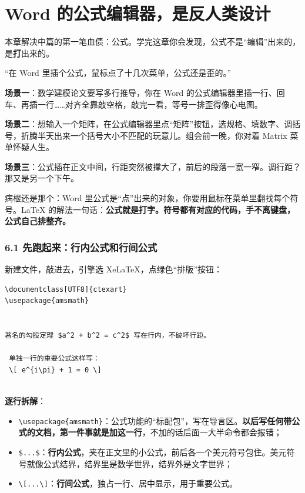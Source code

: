 \chapter{Word 的公式编辑器，是反人类设计}

\begin{notebox}
本章解决中篇的第一笔血债：公式。学完这章你会发现，公式不是“编辑”出来的，是\textbf{打}出来的。
\end{notebox}


“在 Word 里插个公式，鼠标点了十几次菜单，公式还是歪的。”


\textbf{场景一}：数学建模论文要写多行推导，你在 Word 的公式编辑器里插一行、回车、再插一行……对齐全靠敲空格，敲完一看，等号一排歪得像心电图。

\textbf{场景二}：想输入一个矩阵，在公式编辑器里点“矩阵”按钮，选规格、填数字、调括号，折腾半天出来一个括号大小不匹配的玩意儿。组会前一晚，你对着 Matrix 菜单怀疑人生。

\textbf{场景三}：公式插在正文中间，行距突然被撑大了，前后的段落一宽一窄。调行距？那又是另一个下午。

病根还是那个：Word 里公式是“点”出来的对象，你要用鼠标在菜单里翻找每个符号。LaTeX 的解法一句话：\textbf{公式就是打字。符号都有对应的代码，手不离键盘，公式自己排整齐。}


\subsection*{6.1 先跑起来：行内公式和行间公式}

新建文件，敲进去，引擎选 XeLaTeX，点绿色“排版”按钮：

\begin{lstlisting}
\documentclass[UTF8]{ctexart}
\usepackage{amsmath}


著名的勾股定理 $a^2 + b^2 = c^2$ 写在行内，不破坏行距。

 单独一行的重要公式这样写：
 \[ e^{i\pi} + 1 = 0 \]


\end{lstlisting}

\textbf{逐行拆解}：

\begin{itemize}
\setlength{\itemsep}{2pt}
\item \texttt{\textbackslash{}usepackage\{amsmath\}}：公式功能的“标配包”，写在导言区。\textbf{以后写任何带公式的文档，第一件事就是加这一行}，不加的话后面一大半命令都会报错；
\item \texttt{\$...\$}：\textbf{行内公式}，夹在正文里的小公式，前后各一个美元符号包住。美元符号就像公式结界，结界里是数学世界，结界外是文字世界；
\item \texttt{\textbackslash{}[...\textbackslash{}]}：\textbf{行间公式}，独占一行、居中显示，用于重要公式。
\end{itemize}

